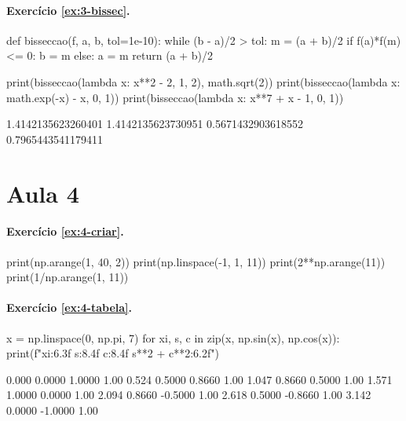 \paragraph{Exercício \ref{ex:3-bissec}.}
\begin{entrada}
def bisseccao(f, a, b, tol=1e-10):
    while (b - a)/2 > tol:
        m = (a + b)/2
        if f(a)*f(m) <= 0:
            b = m
        else:
            a = m
    return (a + b)/2

print(bisseccao(lambda x: x**2 - 2, 1, 2), math.sqrt(2))
print(bisseccao(lambda x: math.exp(-x) - x, 0, 1))
print(bisseccao(lambda x: x**7 + x - 1, 0, 1))
\end{entrada}
\begin{saida}
1.4142135623260401 1.4142135623730951
0.5671432903618552
0.7965443541179411
\end{saida}

\section*{Aula 4}

\paragraph{Exercício \ref{ex:4-criar}.}
\begin{entrada}
print(np.arange(1, 40, 2))
print(np.linspace(-1, 1, 11))
print(2**np.arange(11))
print(1/np.arange(1, 11))
\end{entrada}
\begin{saida}
[ 1  3  5  7  9 11 13 15 17 19 21 23 25 27 29 31 33 35 37 39]
[-1.  -0.8 -0.6 -0.4 -0.2  0.   0.2  0.4  0.6  0.8  1. ]
[   1    2    4    8   16   32   64  128  256  512 1024]
[1.         0.5        0.33333333 0.25       0.2        0.16666667
 0.14285714 0.125      0.11111111 0.1       ]
\end{saida}

\paragraph{Exercício \ref{ex:4-tabela}.}
\begin{entrada}
x = np.linspace(0, np.pi, 7)
for xi, s, c in zip(x, np.sin(x), np.cos(x)):
    print(f"{xi:6.3f} {s:8.4f} {c:8.4f} {s**2 + c**2:6.2f}")
\end{entrada}
\begin{saida}
 0.000   0.0000   1.0000   1.00
 0.524   0.5000   0.8660   1.00
 1.047   0.8660   0.5000   1.00
 1.571   1.0000   0.0000   1.00
 2.094   0.8660  -0.5000   1.00
 2.618   0.5000  -0.8660   1.00
 3.142   0.0000  -1.0000   1.00
\end{saida}


